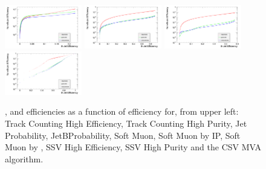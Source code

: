 \begin{figure}[hbtp]
     \includegraphics[width=0.3\textwidth]{Chapters/04_Analysis/04a_BTags/Images/SoftMuonByPt_nonBJetEfficiency_v_bJetEfficiency}\hfill
     \includegraphics[width=0.3\textwidth]{Chapters/04_Analysis/04a_BTags/Images/SimpleSecondaryVertexHighEfficiency_nonBJetEfficiency_v_bJetEfficiency}\hfill
     \includegraphics[width=0.3\textwidth]{Chapters/04_Analysis/04a_BTags/Images/SimpleSecondaryVertexHighPurity_nonBJetEfficiency_v_bJetEfficiency}\\
     \includegraphics[width=0.3\textwidth]{Chapters/04_Analysis/04a_BTags/Images/CombinedSecondaryVertexMVA_nonBJetEfficiency_v_bJetEfficiency}\\
     \caption[\cjet, \gjet and \udsjet efficiencies as a function of \bjet efficiency for CMS
     \btagging algorithms.]{\cjet, \gjet and \udsjet efficiencies as a function of \bjet efficiency for, from
     upper left: Track Counting High Efficiency, Track Counting High Purity, Jet Probability, JetBProbability,
     Soft Muon, Soft Muon by IP, Soft Muon by \pt, SSV High Efficiency, SSV High Purity and the CSV MVA
     algorithm.}
     \label{fig:all_algorithm_efficiencies}
\end{figure}
